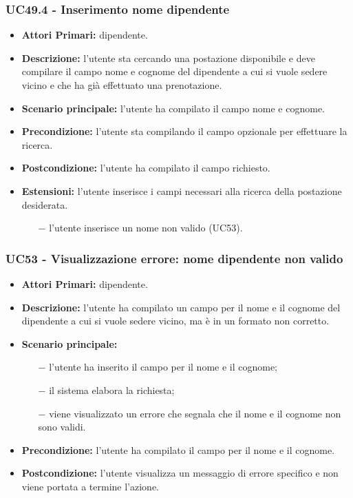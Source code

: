 \subsubsection{ UC49.4 - Inserimento nome dipendente }
\begin{itemize}
	\item\textbf{Attori Primari:} dipendente.
	\item\textbf{Descrizione:} l’utente sta cercando una postazione disponibile e deve compilare il campo nome e cognome del dipendente a cui si vuole sedere vicino e che ha già effettuato una prenotazione.
	\item\textbf{Scenario principale:} l’utente ha compilato il campo nome e cognome.
	\item\textbf{Precondizione:} l’utente sta compilando il campo opzionale per effettuare la ricerca.
	\item\textbf{Postcondizione:} l’utente ha compilato il campo richiesto.
	\item\textbf{Estensioni:} l’utente inserisce i campi necessari alla ricerca della postazione desiderata.
	\begin{itemize}
		\item[$-$] l’utente inserisce un nome non valido (UC53).
	\end{itemize}
\end{itemize}
\subsubsection{ UC53 - Visualizzazione errore: nome dipendente non valido }
\begin{itemize}
	\item\textbf{Attori Primari:} dipendente.
	\item\textbf{Descrizione:} l’utente ha compilato un campo per il nome e il cognome del dipendente a cui si vuole sedere vicino, ma è in un formato non corretto.
	\item\textbf{Scenario principale:} 
	\begin{itemize}
		\item[$-$] l’utente ha inserito il campo per il nome e il cognome;
		\item[$-$] il sistema elabora la richiesta;
		\item[$-$] viene visualizzato un errore che segnala che  il nome e il cognome non sono validi.
	\end{itemize}
	\item\textbf{Precondizione:} l’utente ha compilato il campo per il nome e il cognome.
	\item\textbf{Postcondizione:} l’utente visualizza un messaggio di errore specifico e non viene portata a termine l'azione.
\end{itemize}
